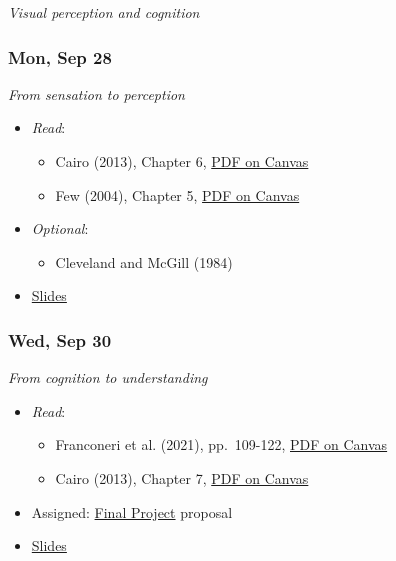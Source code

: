 \documentclass[
  letterpaper,
  DIV=11,
  numbers=noendperiod]{scrartcl}
\providecommand{\tightlist}{%
  \setlength{\itemsep}{0pt}\setlength{\parskip}{0pt}}
\begin{document}
\emph{Visual perception and cognition}

\subsubsection*{Mon, Sep 28}\label{mon-sep-28}

\emph{From sensation to perception}

\begin{itemize}
\tightlist
\item
  \emph{Read}:

  \begin{itemize}
  \tightlist
  \item
    Cairo (2013), Chapter 6,
    \href{https://psu.instructure.com/courses/2484925/files?preview=193582613}{PDF
    on Canvas}
  \item
    Few (2004), Chapter 5,
    \href{https://psu.instructure.com/courses/2484925/files?preview=193582617}{PDF
    on Canvas}
  \end{itemize}
\item
  \emph{Optional}:

  \begin{itemize}
  \tightlist
  \item
    Cleveland and McGill (1984)\\
  \end{itemize}
\item
  \href{404.qmd}{Slides}
\end{itemize}

\subsubsection*{Wed, Sep 30}\label{wed-sep-30}

\emph{From cognition to understanding}

\begin{itemize}
\tightlist
\item
  \emph{Read}:

  \begin{itemize}
  \tightlist
  \item
    Franconeri et al. (2021), pp.~109-122,
    \href{https://psu.instructure.com/courses/2484925/files?preview=193922618}{PDF
    on Canvas}
  \item
    Cairo (2013), Chapter 7,
    \href{https://psu.instructure.com/courses/2484925/files?preview=193582613}{PDF
    on Canvas}
  \end{itemize}
\item
  {Assigned}: \href{exercises/final-project.qmd}{Final Project} proposal
\item
  \href{404.qmd}{Slides}
\end{itemize}
\end{document}
